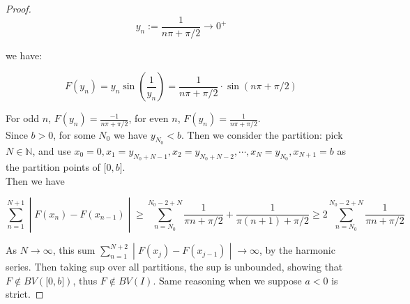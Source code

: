 \begin{proof}
\[y_{n} := \frac{1}{n\pi + \pi/2}\rightarrow 0^{+}\]

we have:

\[F\left( y_{n} \right) = y_{n}\sin\left( \frac{1}{y_{n}} \right) = \frac{1}{n\pi + \pi/2} \cdot \sin(n\pi + \pi/2)\]

For odd \(n\), \(F(y_{n}) = \frac{- 1}{n\pi + \pi/2}\), for even \(n\), \(F(y_{n}) = \frac{1}{n\pi + \pi/2}\).\\
Since \(b > 0\), for some \(N_{0}\) we have \(y_{N_{0}} < b\). Then we consider the partition: pick \(N \in \mathbb{N}\), and use \(x_{0} = 0,x_{1} = y_{N_{0} + N - 1},x_{2} = y_{N_{0} + N - 2},\cdots,x_{N} = y_{N_{0}},x_{N + 1} = b\) as the partition points of \(\lbrack 0,b\rbrack\).\\
Then we have

\[\left. \sum\limits_{n = 1}^{N + 1} \middle| F(x_{n}) - F(x_{n - 1}) \middle| \geq \sum\limits_{n = N_{0}}^{N_{0} - 2 + N}\frac{1}{\pi n + \pi/2} + \frac{1}{\pi(n + 1) + \pi/2} \geq 2\sum\limits_{n = N_{0}}^{N_{0} - 2 + N}\frac{1}{\pi n + \pi/2} \right.\]

As \(N\rightarrow\infty\), this sum \(\left. \sum_{n = 1}^{N + 2} \middle| F(x_{j}) - F(x_{j - 1}) \middle| \rightarrow\infty \right.\), by the harmonic series. Then taking sup over all partitions, the sup is unbounded, showing that \(F \notin BV(\lbrack 0,b\rbrack)\), thus \(F \notin BV(I)\). Same reasoning when we suppose \(a < 0\) is strict.

\end{proof}

